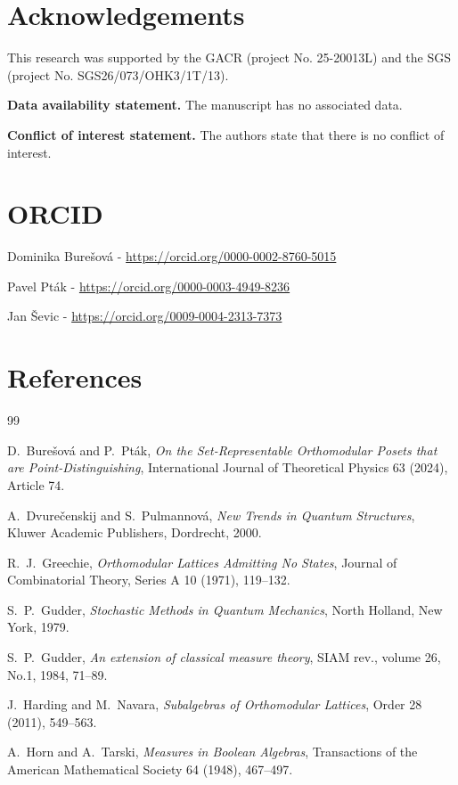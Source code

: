 \documentclass{article}
\begin{document}
{\section*{Acknowledgements}
This research was supported by the GACR (project No. 25-20013L) and the SGS (project No. SGS26/073/OHK3/1T/13).

\textbf{Data availability statement.} The manuscript has no associated data.

\textbf{Conflict of interest statement.} The authors state that there is no conflict of interest. 

\section*{ORCID}
\noindent Dominika Burešová - \url{https://orcid.org/0000-0002-8760-5015}

\noindent Pavel Pták - \url{https://orcid.org/0000-0003-4949-8236}

\noindent Jan Ševic - \url{https://orcid.org/0009-0004-2313-7373}
\section*{References}

\begin{thebibliography}{99}

D.~Burešová and P.~Pták,
\emph{On the Set-Representable Orthomodular Posets that are Point-Distinguishing},
International Journal of Theoretical Physics 63 (2024), Article 74.

A.~Dvurečenskij and S.~Pulmannová,
\emph{New Trends in Quantum Structures},
Kluwer Academic Publishers, Dordrecht, 2000.

R.~J.~Greechie,
\emph{Orthomodular Lattices Admitting No States},
Journal of Combinatorial Theory, Series A 10 (1971), 119--132.

S.~P.~Gudder,
\textit{Stochastic Methods in Quantum Mechanics}, North Holland, New York, 1979.


S.~P.~Gudder,
\emph{An extension of classical measure theory}, SIAM rev., volume 26, No.1, 1984, 71--89.

J.~Harding and M.~Navara,
\emph{Subalgebras of Orthomodular Lattices},
Order 28 (2011), 549--563.


A.~Horn and A.~Tarski,
\emph{Measures in Boolean Algebras},
Transactions of the American Mathematical Society 64 (1948), 467--497.


\end{thebibliography}}
\end{document}
